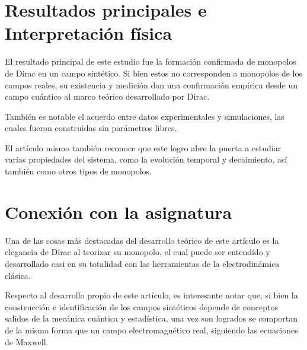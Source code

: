 \documentclass[twocolumn]{article}
\numberwithin{equation}{section}
\newcommand{\0}{\textcolor{gray}{0}}
\begin{document}
	\section{Resultados principales e Interpretación física}
	El resultado principal de este estudio fue la formación confirmada de monopolos de Dirac en un campo sintético. Si bien estos no corresponden a monopolos de los campos reales, su existencia y medición dan una confirmación empírica desde un campo cuántico al marco teórico desarrollado por Dirac.
	
	También es notable el acuerdo entre datos experimentales y simulaciones, las cuales fueron construidas sin parámetros libres.
	
	El artículo mismo también reconoce que este logro abre la puerta a estudiar varias propiedades del sistema, como la evolución temporal y decaimiento, así también como otros tipos de monopolos.
	
	\vspace{-3mm}
	
	\section{Conexión con la asignatura}
	Una de las cosas más destacadas del desarrollo teórico de este artículo es la elegancia de Dirac al teorizar su monopolo, el cual puede ser entendido y desarrollado casi en su totalidad con las herramientas de la electrodinámica clásica.
	
	Respecto al desarrollo propio de este artículo, es interesante notar que, si bien la construcción e identificación de los campos sintéticos depende de conceptos salidos de la mecánica cuántica y estadística, una vez son logrados se comportan de la misma forma que un campo electromagnético real, siguiendo las ecuaciones de Maxwell.
	
\end{document}
